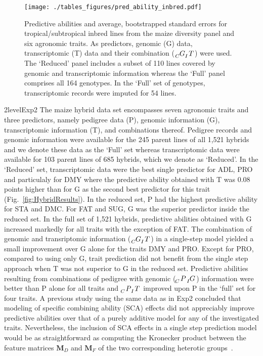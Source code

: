 \documentclass[12pt,titlepage]{article}
\begin{document}
\begin{figure}[H]
  \centering
  \texttt{[image: ./tables\_figures/pred\_ability\_inbred.pdf]}
  \caption{
  Predictive abilities and average, bootstrapped standard errors for
  tropical/subtropical inbred lines from the maize diversity panel and six
  agronomic traits.
  As predictors, genomic (G) data, transcriptomic (T) data and their 
  combination ($\tensor[_{C}]{G}{}\tensor[_{I}]{T}{}$) were used.
  The `Reduced' panel includes a subset of 110 lines covered by genomic and
  transcriptomic information whereas the `Full' panel comprises all 164
  genotypes.
  In the `Full' set of genotypes, transcriptomic records were imputed for 54
  lines.
  }
\label{fig:InbredResults}
\end{figure}



\Genetics2level{Exp2}
The maize hybrid data set encompasses seven agronomic traits and three
predictors, namely pedigree data (P), genomic information (G), transcriptomic
information (T), and combinations thereof.
Pedigree records and genomic information were available for the 245 parent 
lines of all 1,521 hybrids and we denote these data as the `Full' set whereas
transcriptomic data were available for 103 parent lines of 685 hybrids, which
we denote as `Reduced'.
In the `Reduced' set, transcriptomic data were the best single predictor for
ADL, PRO and particulaly for DMY where the predictive ability obtained with T
was 0.08 points higher than for G as the second best predictor for this trait
(Fig.~\ref{fig:HybridResults}).
In the reduced set, P had the highest predictive ability for STA and DMC\@.
For FAT and SUG, G was the superior predictor inside the reduced set.
In the full set of 1,521 hybrids, predictive abilities obtained with G increased
markedly for all traits with the exception of FAT\@.
The combination of genomic and transriptomic information
($\tensor[_{C}]{G}{}\tensor[_{I}]{T}{}$) in a single-step model yielded a small
improvement over G alone for the traits DMY and PRO\@.
Except for PRO, compared to using only G, trait prediction did not benefit from 
the single step approach when T was not superior to G in the reduced set.
Predictive abilities resulting from combinations of pedigree with genomic
($\tensor[_{C}]{P}{}\tensor[_{I}]{G}{}$) information were better than P alone
for all traits and $\tensor[_{C}]{P}{}\tensor[_{I}]{T}{}$ improved upon P in
the `full' set for four traits.
A previous study using the same data as in Exp2 concluded that modeling of
specific combining ability (SCA) effects did not appreciably improve predictive
abilities over that of a purely additive model for any of the investigated
traits.
Nevertheless, the inclusion of SCA effects in a single step prediction model
would be as straightforward as computing the Kronecker product between the
feature matrices $\mathbf{M}_{D}$ and $\mathbf{M}_{F}$ of the two corresponding
heterotic groups~\cite{Martini2016}.
\end{document}
